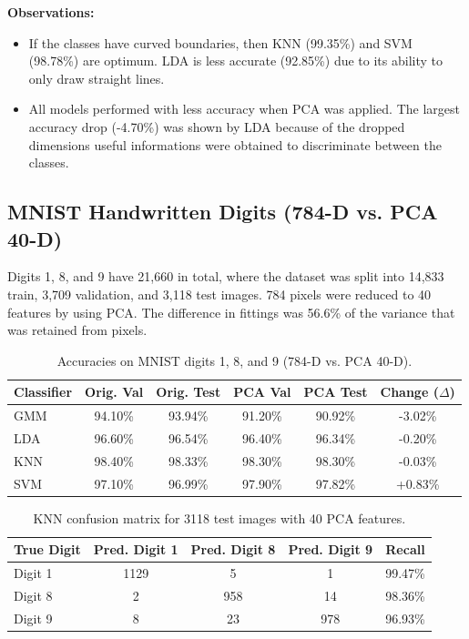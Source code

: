 \documentclass[11pt,a4paper]{article}
\begin{document}
\noindent\textbf{Observations:}
\begin{itemize}
  \item If the classes have curved boundaries, then KNN (99.35\%) and SVM (98.78\%) are optimum. LDA is less accurate (92.85\%) due to its ability to only draw straight lines.
  \item All models performed with less accuracy when PCA was applied. The largest accuracy drop (-4.70\%) was shown by LDA because of the dropped dimensions useful informations were obtained to discriminate between the classes.
\end{itemize}

\subsection{MNIST Handwritten Digits (784-D vs. PCA 40-D)}
Digits 1, 8, and 9 have 21,660 in total, where the dataset was split into 14,833 train, 3,709 validation, and 3,118 test images. 784 pixels were reduced to 40 features by using PCA. The difference in fittings was 56.6\% of the variance that was retained from pixels.

\begin{table}[htbp]
\centering
\begin{tabular}{@{}lccccc@{}}
\toprule
\textbf{Classifier} & \textbf{Orig. Val} & \textbf{Orig. Test} & \textbf{PCA Val} & \textbf{PCA Test} & \textbf{Change ($\Delta$)} \\
\midrule
GMM & 94.10\% & 93.94\% & 91.20\% & 90.92\% & -3.02\% \\
LDA & 96.60\% & 96.54\% & 96.40\% & 96.34\% & -0.20\% \\
KNN & 98.40\% & 98.33\% & 98.30\% & 98.30\% & -0.03\% \\
SVM & 97.10\% & 96.99\% & 97.90\% & 97.82\% & +0.83\% \\
\bottomrule
\end{tabular}
\caption{Accuracies on MNIST digits 1, 8, and 9 (784-D vs. PCA 40-D).}
\label{tab:mnist_acc}
\end{table}

\begin{table}[htbp]
\centering
\begin{tabular}{@{}lcccc@{}}
\toprule
\textbf{True Digit} & \textbf{Pred. Digit 1} & \textbf{Pred. Digit 8} & \textbf{Pred. Digit 9} & \textbf{Recall} \\
\midrule
Digit 1 & 1129 & 5 & 1 & 99.47\% \\
Digit 8 & 2 & 958 & 14 & 98.36\% \\
Digit 9 & 8 & 23 & 978 & 96.93\% \\
\bottomrule
\end{tabular}
\caption{KNN confusion matrix for 3118 test images with 40 PCA features.}
\label{tab:mnist_cm}
\end{table}
\end{document}

